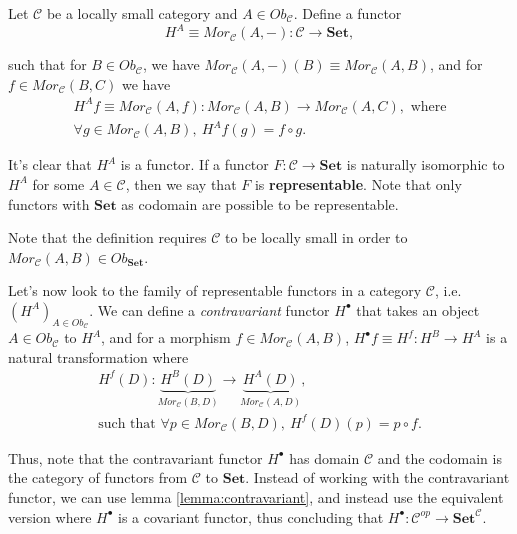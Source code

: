 \begin{definition}
	Let $\mathcal C$ be a locally small category and $A \in Ob_\mathcal C$.
	Define a functor
	\begin{displaymath}
		H^A \equiv Mor_\mathcal C(A,-): \mathcal C \to \mathbf{Set},
	\end{displaymath}

	such that for $B \in Ob_\mathcal C$, we have $Mor_\mathcal C (A,-)(B) \equiv Mor_\mathcal C (A,B)$, and
	for $ f \in Mor_\mathcal C (B,C)$ we have
	\begin{gather*}
		H^A f \equiv Mor_\mathcal C(A,f) : Mor_\mathcal C(A,B) \to Mor_\mathcal C(A,C), \text{ where} \\
		\forall g \in Mor_\mathcal C(A,B) , \ H^A f (g) = f \circ g.
	\end{gather*}

	It's clear that $H^A$ is a functor. If a functor $F:\mathcal C \to \mathbf{Set}$
	is naturally isomorphic to $H^A$ for some $A \in \mathcal C$, then we say that
	$F$ is \textbf{representable}. Note that only functors with $\mathbf{Set}$
	as codomain are possible to be representable.
\end{definition}
Note that the definition requires $\mathcal C$ to be locally small in order to $Mor_\mathcal C (A,B) \in Ob_{\mathbf{Set}}$.

Let's now look to the family of representable functors in a category $\mathcal C$, i.e.
$(H^A)_{A \in Ob_\mathcal C}$. We can define a \textit{contravariant} functor
$H^\bullet$ that takes an object $A \in Ob_\mathcal C$ to $H^A$, and for
a morphism $f \in Mor_\mathcal C (A,B)$, $H^\bullet f \equiv H^f : H^B \to H^A$ is a natural
transformation where
\begin{gather*}
	H^f(D):
	\underbrace{H^B(D)}_{Mor_\mathcal C(B,D)} \to
	\underbrace{H^A(D)}_{Mor_\mathcal C(A,D)}, \\
	\text{such that }\forall p \in Mor_\mathcal C (B,D), \ H^f (D) (p) = p \circ f.
\end{gather*}

Thus, note that the contravariant functor $H^\bullet$ has domain $\mathcal C$
and the codomain is the category of functors from $\mathcal C$ to $\mathbf{Set}$.
Instead of working with the contravariant functor, we can use lemma
\ref{lemma:contravariant}, and instead use the equivalent version where
$H^\bullet$ is a covariant functor, thus concluding that
$H^\bullet: \mathcal C^{op} \to \mathbf{Set}^\mathcal C$.


